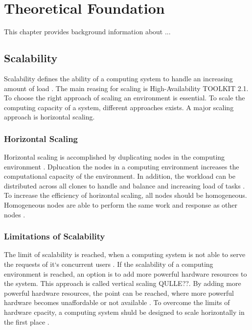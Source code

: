 \chapter{Theoretical Foundation}
\label{chap:02_foundation}
%

This chapter provides background information about ...

\section{Scalability}
Scalability defines the ability of a computing system to handle an increasing amount of load \cite{Farcic2017Toolkit21}.
The main reasing for scaling is High-Availability TOOLKIT 2.1.
To choose the right approach of scaling an environment is essential.
To scale the computing capacity of a system, different approaches exists. A major scaling approach is horizontal scaling.



\subsection{Horizontal Scaling}
Horizontal scaling is accomplished by duplicating nodes in the computing environment \cite{Wilder2012CloudPatterns}.
Dplucation the nodes in a computing environment increases the computational capacity of the environment. In addition, the workload can be distributed across all clones to handle and balance and increasing load of tasks \cite{Wilder2012CloudPatterns, Abbott2015ScalabilityArt}. 
To increase the efficiency of horizontal scaling, all nodes should be homogeneous. Homogeneous nodes are able to perform the same work and response as other nodes \cite{Abbott2015ScalabilityArt}.


\subsection{Limitations of Scalability}
The limit of scalability is reached, when a computing system is not able to serve the requests of it`s concurrent users \cite{Wilder2012CloudPatterns}.
If the scalability of a computing environment is reached, an option is to add more powerful hardware resources to the system. This approach is called vertical scaling QULLE??. By adding more powerful hardware resources, the point can be reached, where more powerful hardware becomes unaffordable or not available \cite{Wilder2012CloudPatterns}.
To overcome the limits of hardware cpacity, a computing system shuld be designed to scale horizontally in the first place \cite{Abbott2015ScalabilityArt}.


